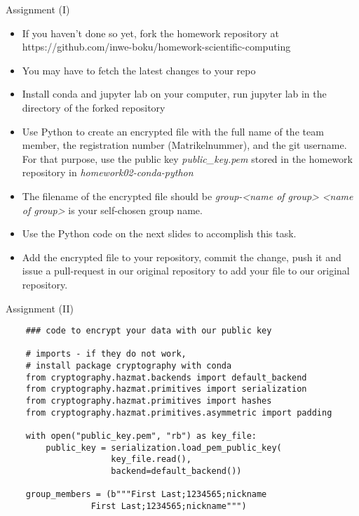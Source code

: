 \begin{frame}{Assignment (I)}
	
	\begin{itemize}
		\item If you haven't done so yet, fork the homework repository at https://github.com/inwe-boku/homework-scientific-computing
		\item You may have to fetch the latest changes to your repo
		\item Install conda and jupyter lab on your computer, run jupyter lab in the directory of the forked repository
		\item Use Python to create an encrypted file with the full name of the team member, the registration number (Matrikelnummer), and the git username. For that purpose, use the public key \textit{public\_key.pem} stored in the homework repository in \textit{homework02-conda-python}
		\item The filename of the encrypted file should be \textit{group-<name of group>} \textit{<name of group>} is your self-chosen group name.
		\item Use the Python code on the next slides to accomplish this task.
		\item Add the encrypted file to your repository, commit the change, push it and issue a pull-request in our original repository to add your file to our original repository.
		
		
	\end{itemize}
	
	
\end{frame}

\begin{frame}[fragile]{Assignment (II)}
	
	\begin{verbatim}
	### code to encrypt your data with our public key
	
	# imports - if they do not work,
	# install package cryptography with conda
	from cryptography.hazmat.backends import default_backend
	from cryptography.hazmat.primitives import serialization
	from cryptography.hazmat.primitives import hashes
	from cryptography.hazmat.primitives.asymmetric import padding
	
	with open("public_key.pem", "rb") as key_file:
	    public_key = serialization.load_pem_public_key(
	                 key_file.read(),
	                 backend=default_backend())
		
	group_members = (b"""First Last;1234565;nickname
                 First Last;1234565;nickname""")
	
	
	\end{verbatim}
	
\end{frame}

